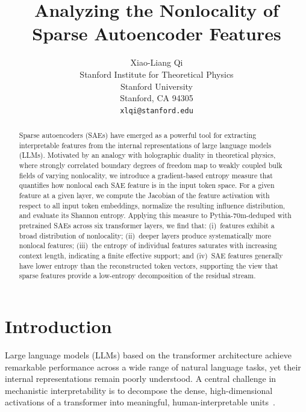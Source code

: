 \documentclass{article}
\title{Analyzing the Nonlocality of Sparse Autoencoder Features}
\author{%
  Xiao-Liang Qi \\
  Stanford Institute for Theoretical Physics\\
  Stanford University\\
  Stanford, CA 94305 \\
  \texttt{xlqi@stanford.edu} \\
}
\begin{document}
\maketitle

\begin{abstract}
    Sparse autoencoders (SAEs) have emerged as a powerful tool for extracting
    interpretable features from the internal representations of large language
    models (LLMs). Motivated by an analogy with holographic duality in
    theoretical physics, where strongly correlated boundary degrees of freedom
    map to weakly coupled bulk fields of varying nonlocality, we introduce a
    gradient-based entropy measure that quantifies how nonlocal each SAE
    feature is in the input token space. For a given feature at a given layer,
    we compute the Jacobian of the feature activation with respect to all input
    token embeddings, normalize the resulting influence distribution, and
    evaluate its Shannon entropy. Applying this measure to Pythia-70m-deduped
    with pretrained SAEs across six transformer layers, we find that:
    (i)~features exhibit a broad distribution of nonlocality;
    (ii)~deeper layers produce systematically more nonlocal features;
    (iii)~the entropy of individual features saturates with increasing context
    length, indicating a finite effective support; and
    (iv)~SAE features generally have lower entropy than the reconstructed token
    vectors, supporting the view that sparse features provide a low-entropy
    decomposition of the residual stream.
\end{abstract}

\section{Introduction}
\label{sec:introduction}

Large language models (LLMs) based on the transformer architecture achieve
remarkable performance across a wide range of natural language tasks, yet
their internal representations remain poorly understood. A central challenge
in mechanistic interpretability is to decompose the dense,
high-dimensional activations of a transformer into meaningful,
human-interpretable units~\citep{bricken2023monosemanticity,
    templeton2024scaling}.
\end{document}
